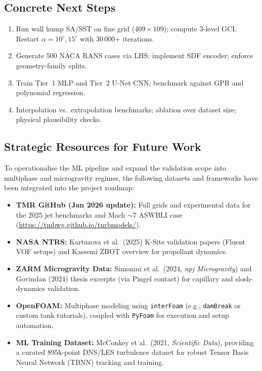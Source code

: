 \documentclass[11pt,a4paper]{article}
\begin{document}
\subsection{Concrete Next Steps}

\begin{enumerate}
  \item[\textbf{CFD}] Run wall hump SA/SST on fine grid ($409\times109$);
    compute 3-level GCI. Restart $\alpha = 10^\circ, 15^\circ$ with 30\,000+
    iterations.
  \item[\textbf{Data}] Generate 500 NACA RANS cases via LHS; implement SDF
    encoder; enforce geometry-family splits.
  \item[\textbf{ML}] Train Tier~1 MLP and Tier~2 U-Net CNN; benchmark
    against GPR and polynomial regression.
  \item[\textbf{V\&V}] Interpolation vs.\ extrapolation benchmarks;
    ablation over dataset size; physical plausibility checks.
\end{enumerate}

\subsection{Strategic Resources for Future Work}
\label{sec:strategic_resources}

To operationalise the ML pipeline and expand the validation scope into multiphase and microgravity regimes, the following datasets and frameworks have been integrated into the project roadmap:

\begin{itemize}
  \item \textbf{TMR GitHub (Jan 2026 update):} Full grids and experimental data for the 2025 jet benchmarks and Mach $\sim$7 ASWBLI case (\url{https://tmbwg.github.io/turbmodels/}).
  \item \textbf{NASA NTRS:} Kartuzova et al.\ (2025) K-Site validation papers (Fluent VOF setups) and Kassemi ZBOT overview for propellant dynamics.
  \item \textbf{ZARM Microgravity Data:} Simonini et al.\ (2024, \textit{npj Microgravity}) and Govindan (2024) thesis excerpts (via Pingel contact) for capillary and slosh-dynamics validation.
  \item \textbf{OpenFOAM:} Multiphase modeling using \texttt{interFoam} (e.g., \texttt{damBreak} or custom tank tutorials), coupled with \texttt{PyFoam} for execution and setup automation.
  \item \textbf{ML Training Dataset:} McConkey et al.\ (2021, \textit{Scientific Data}), providing a curated 895k-point DNS/LES turbulence dataset for robust Tensor Basis Neural Network (TBNN) tracking and training.
\end{itemize}
\end{document}
